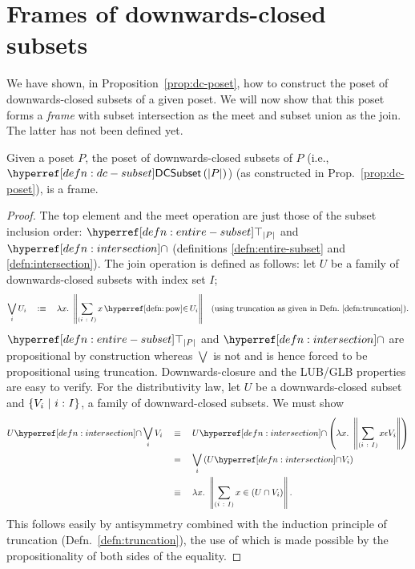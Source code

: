 \section{Frames of downwards-closed subsets}\label{sec:down-set-frame}

We have shown, in Proposition~\ref{prop:dc-poset}, how to construct the poset of
downwards-closed subsets of a given poset. We will now show that this poset forms a
\emph{frame} with subset intersection as the meet and subset union as the join. The latter
has not been defined yet.

\begin{thm}\label{thm:down-set-frame}
  Given a poset $P$, the poset of downwards-closed subsets of $P$ (i.e.,
  $\dcsubset{\abs{P}}$) (as constructed in Prop.~\ref{prop:dc-poset}), is a frame.
\end{thm}
\begin{proof}
  The top element and the meet operation are just those of the subset inclusion order:
  $\entire{\abs{P}}$ and $\intersectnm{}$ (definitions \ref{defn:entire-subset} and
  \ref{defn:intersection}). The join operation is defined as follows: let $U$ be a family
  of downwards-closed subsets with index set $I$;
  \begin{align*}
    \bigvee_i U_i \quad\is\quad \lambda x.~ \trunc{\sigmaty{i}{I}{\mempow{x}{U_i}}}
      && \text{(using truncation as given in Defn.~\ref{defn:truncation})}.
  \end{align*}
  $\entire{\abs{P}}$ and $\intersectnm{}$ are propositional by construction whereas $\bigvee$ is
  not and is hence forced to be propositional using truncation. Downwards-closure and the
  LUB/GLB properties are easy to verify. For the distributivity law, let $U$ be a
  downwards-closed subset and $\left\{  V_i ~|~ i\hspace{0.1mm}:\hspace{0.1mm}I  \right\}$, a family of
  downward-closed subsets. We must show
  \begin{align*}
    \intersect{U}{\bigvee_i V_i}
      \quad&\equiv\quad \intersect{U}{\left(\lambda x.~ \trunc{\sigmaty{i}{I}{x \epsilon V_i}}\right)}\\
      \quad&=\quad \bigvee_i \left(\intersect{U}{V_i} \right)\\
      \quad&\equiv\quad \lambda x.~ \trunc{\sigmaty{i}{I}{x \in (U \cap V_i)}}.
  \end{align*}
  This follows easily by antisymmetry combined with the induction principle of truncation
  (Defn.~\ref{defn:truncation}), the use of which is made possible by the propositionality
  of both sides of the equality.
\end{proof}

